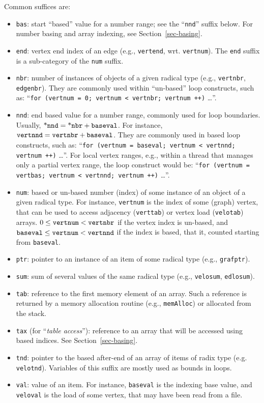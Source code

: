 Common suffices are:
\begin{itemize}
\item
\texttt{bas}: start ``based'' value for a number range; see the
``\texttt{nnd}'' suffix below. For number basing and array indexing,
see Section~\ref{sec-basing}.
\item
\texttt{end}: vertex end index of an edge (e.g.,
\texttt{vertend}, wrt. \texttt{vertnum}). The \texttt{end} suffix is
a sub-category of the \texttt{num} suffix.
\item
\texttt{nbr}: number of instances of objects of a given radical
type (e.g., \texttt{vertnbr}, \texttt{edgenbr}). They are commonly
used within ``un-based'' loop constructs, such as:
``\texttt{for (vertnum = 0; vertnum < vertnbr; vertnum ++)} \ldots''.
\item
\texttt{nnd}: end based value for a number range, commonly used
for loop boundaries. Usually, $\mbox{*\texttt{nnd}} =
\mbox{*\texttt{nbr}} + \mbox{\texttt{baseval}}$. For instance,
$\mbox{\texttt{vertnnd}} = \mbox{\texttt{vertnbr}} +
\mbox{\texttt{baseval}}$. They are commonly used in based loop
constructs, such as:
``\texttt{for (vertnum = baseval; vertnum < vertnnd; vertnum ++)}
\ldots''. For local vertex ranges, e.g., within a thread that manages
only a partial vertex range, the loop construct would be:
``\texttt{for (vertnum = vertbas; vertnum < vertnnd; vertnum ++)}
\ldots''.
\item
\texttt{num}: based or un-based number (index) of some instance of an
object of a given radical type. For instance, \texttt{vertnum} is the
index of some (graph) vertex, that can be used to access adjacency
(\texttt{verttab}) or vertex load (\texttt{velotab}) arrays.
$0 \leq \mbox{\texttt{vertnum}} < \mbox{\texttt{vertnbr}}$ if the
vertex index is un-based, and $\mbox{\texttt{baseval}} \leq
\mbox{\texttt{vertnum}} < \mbox{\texttt{vertnnd}}$
if the index is based, that it, counted starting from
\texttt{baseval}.
\item
\texttt{ptr}: pointer to an instance of an item of some radical type
(e.g., \texttt{grafptr}).
\item
\texttt{sum}: sum of several values of the same radical type (e.g.,
\texttt{velosum}, \texttt{edlosum}).
\item
\texttt{tab}: reference to the first memory element of an array. Such
a reference is returned by a memory allocation routine (e.g.,
\texttt{mem\lbt Alloc}) or allocated from the stack.
\item
\texttt{tax} (for ``\textit{table access}''): reference to an array
that will be accessed using based indices. See
Section~\ref{sec-basing}.
\item
\texttt{tnd}: pointer to the based after-end of an array of items
of radix type (e.g. \texttt{velotnd}). Variables of this suffix are
mostly used as bounds in loops.
\item
\texttt{val}: value of an item. For instance, \texttt{baseval} is the
indexing base value, and \texttt{veloval} is the load of some vertex,
that may have been read from a file.
\end{itemize}

